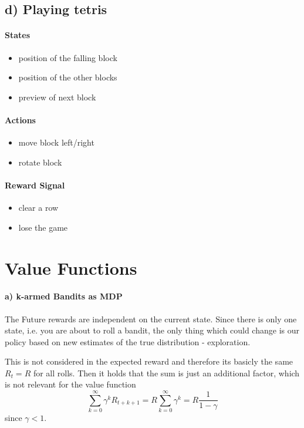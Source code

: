 \documentclass{article}
\begin{document}
\subsection*{d) Playing tetris}

\paragraph*{States}
\begin{itemize}
    \item position of the falling block
    \item position of the other blocks
    \item preview of next block
\end{itemize}


\paragraph*{Actions}
\begin{itemize}
    \item move block left/right
    \item rotate block
\end{itemize}

\paragraph*{Reward Signal}
\begin{itemize}
    \item clear a row
    \item lose the game
\end{itemize}



\section{Value Functions}

\paragraph*{a) k-armed Bandits as MDP}

The Future rewards are independent on the current state. Since there is only one state, i.e. you are about to roll a bandit, the only thing which could change is our policy based on new estimates of the true distribution - exploration. 

This is not considered in the expected reward and therefore its basicly  the same $R_t = R$ for all rolls. Then it holds that the sum is just an additional factor, which is not relevant for the value function
\begin{equation}
    \sum_{k=0}^\infty \gamma^k R_{t+k+1} = R  \sum_{k=0}^\infty \gamma^k = R \frac{1}{1-\gamma}
\end{equation} 
since $\gamma < 1$.
\end{document}
